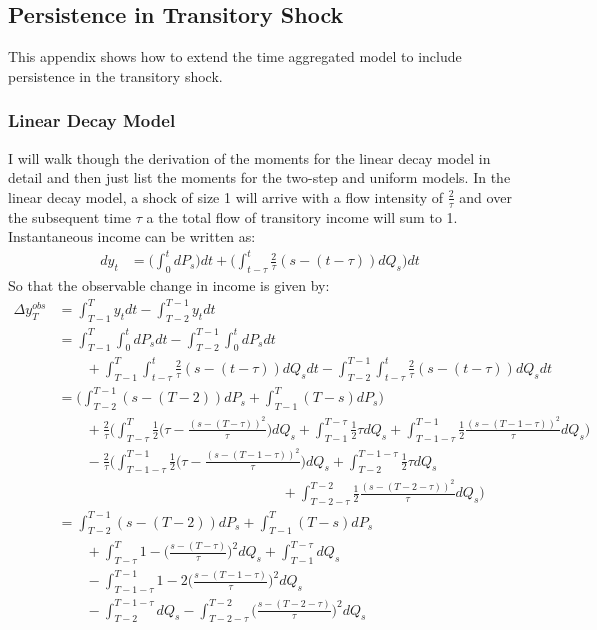 \subsection{Persistence in Transitory Shock} \label{persistence_appendix}
This appendix shows how to extend the time aggregated model to include persistence in the transitory shock.

\subsubsection{Linear Decay Model}
I will walk though the derivation of the moments for the linear decay model in detail and then just list the moments for the two-step and uniform models. In the linear decay model, a shock of size 1 will arrive with a flow intensity of $\frac{2}{\tau}$ and over the subsequent time $\tau$ a the total flow of transitory income will sum to 1. Instantaneous income can be written as:
 \begin{align*}
dy_t &= \Big(\int_{0}^{t} dP_s \Big) dt +\Big(\int_{t-\tau}^{t} \frac{2}{\tau}(s-(t-\tau)) dQ_s \Big)dt
 \end{align*}
So that the observable change in income is given by:
\begin{align*}
\Delta y^{obs}_T &= \int_{T-1}^{T} y_t dt - \int_{T-2}^{T-1} y_t dt \nonumber \\ 
&= \int_{T-1}^{T} \int_{0}^{t}dP_s dt -\int_{T-2}^{T-1} \int_{0}^{t}dP_s dt \nonumber \\
& \qquad +  \int_{T-1}^{T} \int_{t-\tau}^{t} \frac{2}{\tau}(s-(t-\tau)) dQ_s dt -\int_{T-2}^{T-1}\int_{t-\tau}^{t} \frac{2}{\tau}(s-(t-\tau)) dQ_s dt \nonumber \\
&= \Big(\int_{T-2}^{T-1} (s-(T-2))dP_s  + \int_{T-1}^{T} (T-s)dP_s \Big) \nonumber \\
&  \qquad +\frac{2}{\tau} \Big(\int_{T-\tau}^{T} \frac{1}{2}\Big(\tau - \frac{(s-(T-\tau))^2}{\tau} \Big)dQ_s  +\int_{T-1}^{T-\tau} \frac{1}{2}\tau dQ_s  +\int_{T-1-\tau}^{T-1} \frac{1}{2}\frac{(s-(T-1-\tau))^2}{\tau} dQ_s \Big) \nonumber \\
& \qquad -\frac{2}{\tau}  \Big(\int_{T-1-\tau}^{T-1} \frac{1}{2}\Big(\tau - \frac{(s-(T-1-\tau))^2}{\tau} \Big)dQ_s  +\int_{T-2}^{T-1-\tau} \frac{1}{2}\tau dQ_s \nonumber \\
& \qquad \qquad \qquad \qquad \qquad \qquad \qquad \qquad  +\int_{T-2-\tau}^{T-2} \frac{1}{2}\frac{(s-(T-2-\tau))^2}{\tau} dQ_s \Big) \nonumber \\
&= \int_{T-2}^{T-1} (s-(T-2))dP_s  + \int_{T-1}^{T} (T-s)dP_s  \nonumber \\
&  \qquad +\int_{T-\tau}^{T} 1 - \Big(\frac{s-(T-\tau)}{\tau}\Big)^2 dQ_s  +\int_{T-1}^{T-\tau}  dQ_s   \nonumber \\
& \qquad - \int_{T-1-\tau}^{T-1} 1 - 2\Big(\frac{s-(T-1-\tau)}{\tau}\Big)^2 dQ_s \nonumber \\
& \qquad-  \int_{T-2}^{T-1-\tau}  dQ_s  -\int_{T-2-\tau}^{T-2} \Big(\frac{s-(T-2-\tau)}{\tau}\Big)^2 dQ_s 
\end{align*}
